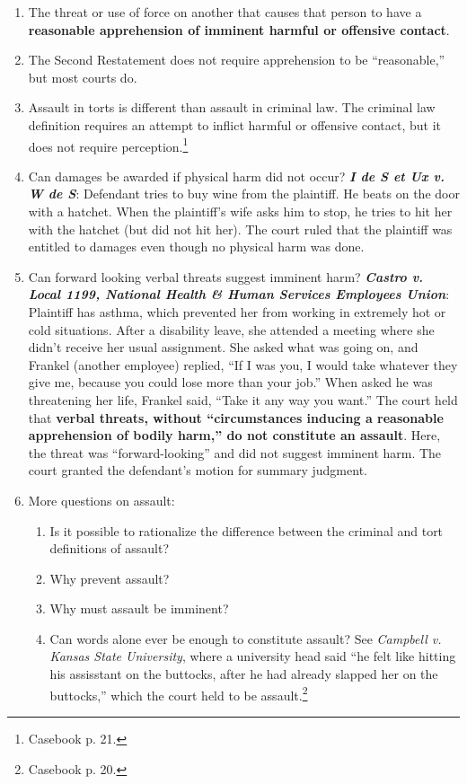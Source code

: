 \begin{enumerate}
    \item The threat or use of force on another that causes that person to have a \textbf{reasonable apprehension of imminent harmful or offensive contact}.
    \item The Second Restatement does not require apprehension to be ``reasonable,'' but most courts do.
    \item Assault in torts is different than assault in criminal law. The criminal law definition requires an attempt to inflict harmful or offensive contact, but it does not require perception.\footnote{Casebook p. 21.}
    \item Can damages be awarded if physical harm did not occur? \textbf{\emph{I de S et Ux v. W de S}}: Defendant tries to buy wine from the plaintiff. He beats on the door with a hatchet. When the plaintiff's wife asks him to stop, he tries to hit her with the hatchet (but did not hit her). The court ruled that the plaintiff was entitled to damages even though no physical harm was done.
    \item Can forward looking verbal threats suggest imminent harm? \textbf{\emph{Castro v. Local 1199, National Health \& Human Services Employees Union}}: Plaintiff has asthma, which prevented her from working in extremely hot or cold situations. After a disability leave, she attended a meeting where she didn't receive her usual assignment. She asked what was going on, and Frankel (another employee) replied, ``If I was you, I would take whatever they give me, because you could lose more than your job.'' When asked he was threatening her life, Frankel said, ``Take it any way you want.'' The court held that \textbf{verbal threats, without ``circumstances inducing a reasonable apprehension of bodily harm,'' do not constitute an assault}. Here, the threat was ``forward-looking'' and did not suggest imminent harm. The court granted the defendant's motion for summary judgment.
    \item More questions on assault:
    \begin{enumerate}
        \item Is it possible to rationalize the difference between the criminal and tort definitions of assault?
        \item Why prevent assault?
        \item Why must assault be imminent?
        \item Can words alone ever be enough to constitute assault? See \emph{Campbell v. Kansas State University}, where a university head said ``he felt like hitting his assisstant on the buttocks, after he had already slapped her on the buttocks,'' which the court held to be assault.\footnote{Casebook p. 20.}
    \end{enumerate}
\end{enumerate}

